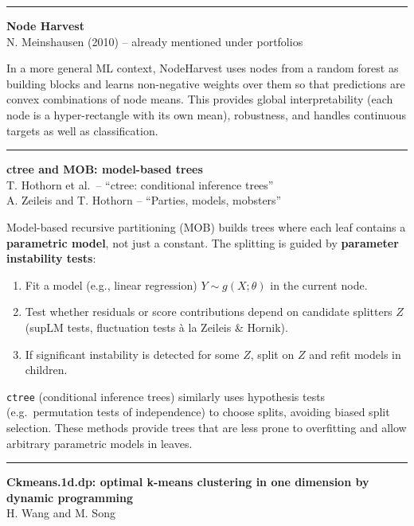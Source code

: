 \documentclass[a5paper]{article}
\providecommand{\tightlist}{%
  \setlength{\itemsep}{0pt}\setlength{\parskip}{0pt}}
\begin{document}
\begin{center}\rule{0.5\linewidth}{0.5pt}\end{center}

\textbf{Node Harvest}\\
N. Meinshausen (2010) -- already mentioned under portfolios

In a more general ML context, NodeHarvest uses nodes from a random
forest as building blocks and learns non-negative weights over them so
that predictions are convex combinations of node means. This provides
global interpretability (each node is a hyper-rectangle with its own
mean), robustness, and handles continuous targets as well as
classification.

\begin{center}\rule{0.5\linewidth}{0.5pt}\end{center}

\textbf{ctree and MOB: model-based trees}\\
T. Hothorn et al.~-- ``ctree: conditional inference trees''\\
A. Zeileis and T. Hothorn -- ``Parties, models, mobsters''

Model-based recursive partitioning (MOB) builds trees where each leaf
contains a \textbf{parametric model}, not just a constant. The splitting
is guided by \textbf{parameter instability tests}:

\begin{enumerate}
\def\labelenumi{\arabic{enumi}.}
\tightlist
\item
  Fit a model (e.g., linear regression) $Y\sim g(X;\theta)$ in the current node.
\item
  Test whether residuals or score contributions depend on candidate
  splitters $Z$ (supLM tests, fluctuation tests à la Zeileis \& Hornik).
\item
  If significant instability is detected for some $Z$, split on $Z$ and
  refit models in children.
\end{enumerate}

\texttt{ctree} (conditional inference trees) similarly uses hypothesis tests
(e.g.~permutation tests of independence) to choose splits, avoiding
biased split selection. These methods provide trees that are less prone
to overfitting and allow arbitrary parametric models in leaves.

\begin{center}\rule{0.5\linewidth}{0.5pt}\end{center}

\textbf{Ckmeans.1d.dp: optimal k-means clustering in one dimension by
dynamic programming}\\
H. Wang and M. Song
\end{document}

